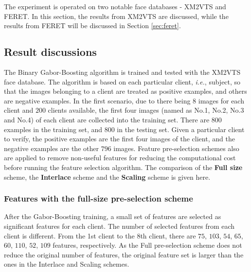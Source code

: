The experiment is operated on two notable face databases - XM2VTS and FERET. In this section, the results from XM2VTS are discussed, while the results from FERET will be discussed in \mbox{Section} \ref{sec:feret}.
\subsection{Result discussions}
The Binary Gabor-Boosting algorithm is trained and tested with the \mbox{XM2VTS} face database.
The algorithm is based on each particular client, \textit{i.e.}, subject, so that the images belonging to a client are treated as positive examples, and others are negative examples. In the first scenario, due to there being $8$ images for each client and $200$ clients available, the first four images (named as No.1, No.2, No.3 and No.4) of each client are collected into the training set. There are $800$ examples in the training set, and $800$ in the testing set. Given a particular client to verify, the positive examples are the first four images of the client, and the negative examples are the other $796$ images. 
Feature pre-selection schemes also are applied to remove non-useful features for reducing the computational cost before running the feature selection algorithm. The comparison of the \textbf{Full size} scheme, the \textbf{Interlace} scheme and the \textbf{Scaling} scheme is given here.
 
\subsubsection{Features with the full-size pre-selection scheme}
After the Gabor-Boosting training, a small set of features are selected as significant features for each client. The number of selected features from each client is different. From the 1st client to the 8th client, there are $75$, $103$, $54$, $65$, $60$, $110$, $52$, $109$ features, respectively. As the Full pre-selection scheme does not reduce the original number of features, the original feature set is larger than the ones in the Interlace and Scaling schemes.

